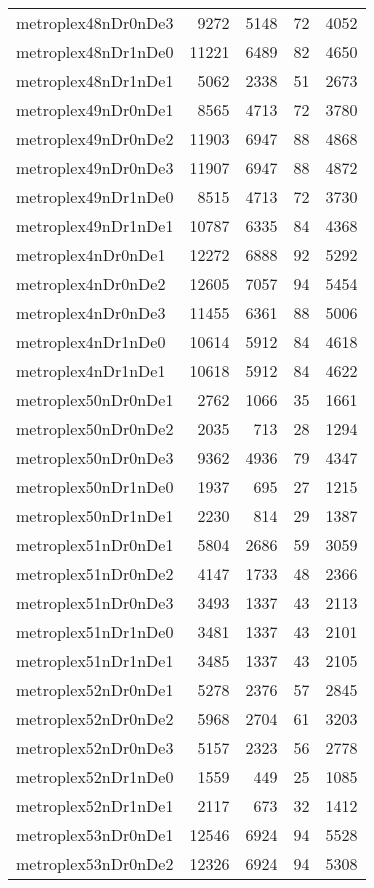 \documentclass[../../../thesis.tex]{subfiles}
\begin{document}
\begin{longtable}{lrrrr}
metroplex48nDr0nDe3 & 9272 & 5148 & 72 & 4052 \\
metroplex48nDr1nDe0 & 11221 & 6489 & 82 & 4650 \\
metroplex48nDr1nDe1 & 5062 & 2338 & 51 & 2673 \\
metroplex49nDr0nDe1 & 8565 & 4713 & 72 & 3780 \\
metroplex49nDr0nDe2 & 11903 & 6947 & 88 & 4868 \\
metroplex49nDr0nDe3 & 11907 & 6947 & 88 & 4872 \\
metroplex49nDr1nDe0 & 8515 & 4713 & 72 & 3730 \\
metroplex49nDr1nDe1 & 10787 & 6335 & 84 & 4368 \\
metroplex4nDr0nDe1 & 12272 & 6888 & 92 & 5292 \\
metroplex4nDr0nDe2 & 12605 & 7057 & 94 & 5454 \\
metroplex4nDr0nDe3 & 11455 & 6361 & 88 & 5006 \\
metroplex4nDr1nDe0 & 10614 & 5912 & 84 & 4618 \\
metroplex4nDr1nDe1 & 10618 & 5912 & 84 & 4622 \\
metroplex50nDr0nDe1 & 2762 & 1066 & 35 & 1661 \\
metroplex50nDr0nDe2 & 2035 & 713 & 28 & 1294 \\
metroplex50nDr0nDe3 & 9362 & 4936 & 79 & 4347 \\
metroplex50nDr1nDe0 & 1937 & 695 & 27 & 1215 \\
metroplex50nDr1nDe1 & 2230 & 814 & 29 & 1387 \\
metroplex51nDr0nDe1 & 5804 & 2686 & 59 & 3059 \\
metroplex51nDr0nDe2 & 4147 & 1733 & 48 & 2366 \\
metroplex51nDr0nDe3 & 3493 & 1337 & 43 & 2113 \\
metroplex51nDr1nDe0 & 3481 & 1337 & 43 & 2101 \\
metroplex51nDr1nDe1 & 3485 & 1337 & 43 & 2105 \\
metroplex52nDr0nDe1 & 5278 & 2376 & 57 & 2845 \\
metroplex52nDr0nDe2 & 5968 & 2704 & 61 & 3203 \\
metroplex52nDr0nDe3 & 5157 & 2323 & 56 & 2778 \\
metroplex52nDr1nDe0 & 1559 & 449 & 25 & 1085 \\
metroplex52nDr1nDe1 & 2117 & 673 & 32 & 1412 \\
metroplex53nDr0nDe1 & 12546 & 6924 & 94 & 5528 \\
metroplex53nDr0nDe2 & 12326 & 6924 & 94 & 5308 \\

\end{longtable}
\end{document}
